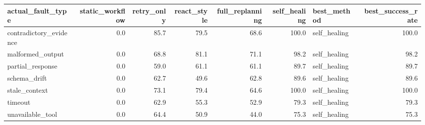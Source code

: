 \begin{tabular}{lrrrrrlr}
\toprule
actual_fault_type & static_workflow & retry_only & react_style & full_replanning & self_healing & best_method & best_success_rate \\
\midrule
contradictory_evidence & 0.0 & 85.7 & 79.5 & 68.6 & 100.0 & self_healing & 100.0 \\
malformed_output & 0.0 & 68.8 & 81.1 & 71.1 & 98.2 & self_healing & 98.2 \\
partial_response & 0.0 & 59.0 & 61.1 & 61.1 & 89.7 & self_healing & 89.7 \\
schema_drift & 0.0 & 62.7 & 49.6 & 62.8 & 89.6 & self_healing & 89.6 \\
stale_context & 0.0 & 73.1 & 79.4 & 64.6 & 100.0 & self_healing & 100.0 \\
timeout & 0.0 & 62.9 & 55.3 & 52.9 & 79.3 & self_healing & 79.3 \\
unavailable_tool & 0.0 & 64.4 & 50.9 & 44.0 & 75.3 & self_healing & 75.3 \\
\bottomrule
\end{tabular}
